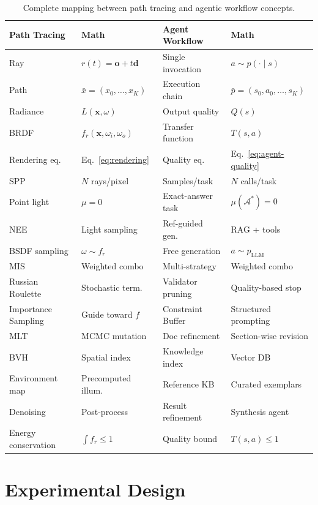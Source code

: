 \documentclass[11pt,twocolumn]{article}
\theoremstyle{definition}
\newcommand{\Astar}{\mathcal{A}^{\ast}}
\newcommand{\pLLM}{p_{\text{LLM}}}
\newcommand{\bx}{\mathbf{x}}
\begin{document}
\begin{table}[t]
\centering
\caption{Complete mapping between path tracing and agentic workflow concepts.}
\label{tab:mapping}
\small
\begin{tabular}{@{}llll@{}}
\toprule
\textbf{Path Tracing} & \textbf{Math} & \textbf{Agent Workflow} & \textbf{Math} \\
\midrule
Ray & $r(t) = \mathbf{o} + t\mathbf{d}$ & Single invocation & $a \sim p(\cdot \mid s)$ \\
Path & $\bar{x} = (x_0,\ldots,x_K)$ & Execution chain & $\bar{p} = (s_0,a_0,\ldots,s_K)$ \\
Radiance & $L(\bx, \omega)$ & Output quality & $Q(s)$ \\
BRDF & $f_r(\bx, \omega_i, \omega_o)$ & Transfer function & $T(s, a)$ \\
Rendering eq.\ & Eq.~\eqref{eq:rendering} & Quality eq.\ & Eq.~\eqref{eq:agent-quality} \\
SPP & $N$ rays/pixel & Samples/task & $N$ calls/task \\
Point light & $\mu = 0$ & Exact-answer task & $\mu(\Astar) = 0$ \\
NEE & Light sampling & Ref-guided gen.\ & RAG + tools \\
BSDF sampling & $\omega \sim f_r$ & Free generation & $a \sim \pLLM$ \\
MIS & Weighted combo & Multi-strategy & Weighted combo \\
Russian Roulette & Stochastic term.\ & Validator pruning & Quality-based stop \\
Importance Sampling & Guide toward $f$ & Constraint Buffer & Structured prompting \\
MLT & MCMC mutation & Doc refinement & Section-wise revision \\
BVH & Spatial index & Knowledge index & Vector DB \\
Environment map & Precomputed illum.\ & Reference KB & Curated exemplars \\
Denoising & Post-process & Result refinement & Synthesis agent \\
Energy conservation & $\int f_r \leq 1$ & Quality bound & $T(s,a) \leq 1$ \\
\bottomrule
\end{tabular}
\end{table}

\section{Experimental Design}\label{sec:experiments}
\end{document}

